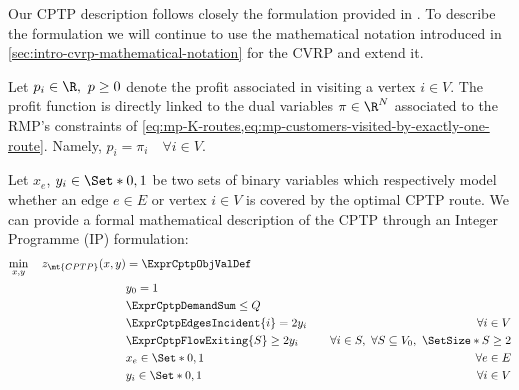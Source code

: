 Our CPTP description follows closely the formulation provided in \textcite{jepsen2014}.
To describe the formulation
we will continue to use the mathematical notation introduced in \cref{sec:intro-cvrp-mathematical-notation}
for the CVRP and extend it.

Let $p_i \in \R,\ p \ge 0$ denote the profit associated in visiting a vertex $i \in V$.
The profit function is directly linked to the dual variables $\pi \in \R^N$ associated to
the RMP's constraints of \cref{eq:mp-K-routes,eq:mp-customers-visited-by-exactly-one-route}.
Namely, $p_i = \pi_i \quad \forall i \in V$.

Let $x_{e}$, $y_{i} \in \Set*{0, 1}$ be two sets of binary variables which respectively
model whether an edge $e \in E$ or vertex $i \in V$ is covered by the optimal CPTP route.
We can provide a formal mathematical description of the CPTP through an Integer Programme (IP) formulation:
\begin{align}
	\min_{x,y} \quad z_\mt{CPTP}(x, y) & = \ExprCptpObjValDef \label{eq:cptp-obj-function}                                                                                                         \\
	                                   & y_0 = 1                                           & \label{eq:cptp-depot-part-of-tour-constraint}                                                         \\
	                                   & \ExprCptpDemandSum  \le Q                         & \label{eq:cptp-resource-upper-bound-constraint}                                                       \\
	                                   & \ExprCptpEdgesIncident{i}  = 2 y_i                & \quad \forall i \in V         \label{eq:cptp-flow-conservation-constraint}                            \\
	                                   & \ExprCptpFlowExiting{S} \ge 2 y_{i}               & \quad \forall i \in S,\ \forall S \subseteq V_0,\ \SetSize*{S} \ge 2 \label{eq:cptp-gsec-constraints} \\
	                                   & x_{e}                   \in \Set*{0, 1}           & \quad \forall e \in E               \label{eq:cptp-x-mip-var-bounds}                                  \\
	                                   & y_{i}                    \in \Set*{0, 1}          & \quad \forall i \in V             \label{eq:cptp-y-mip-var-bounds}
\end{align}

